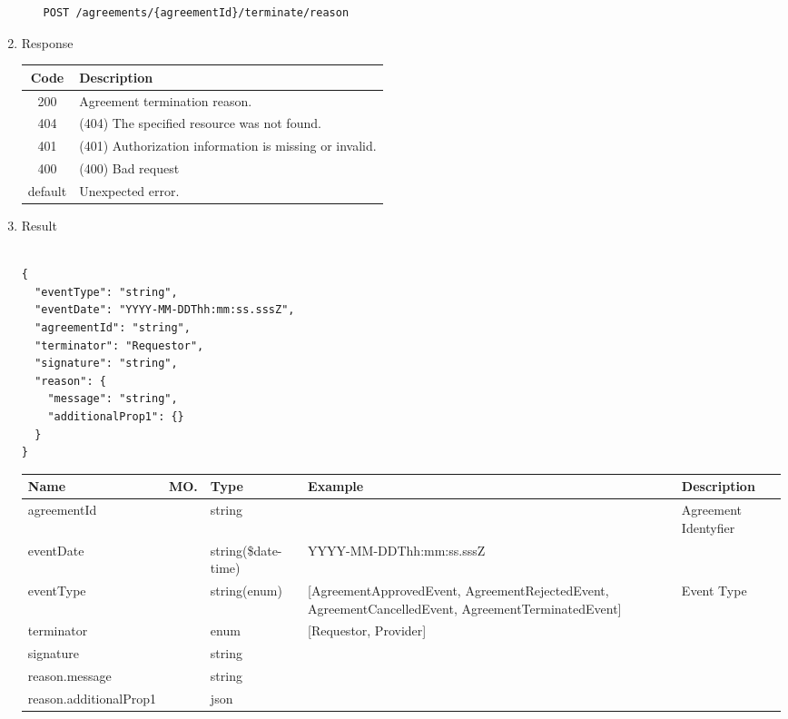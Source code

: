 \begin{enumerate}
\begin{enumerate}
\begin{tcolorbox}[boxrule=0pt, frame empty]
\begin{verbatim}
POST /agreements/{agreementId}/terminate/reason

\end{verbatim}
\end{tcolorbox}

\end{enumerate}

\item Response

\begin{center}
\begin{tabular}{|c|l|} 
\hline
\rowcolor{lightgray}	Code 		& 	Description \\
\hline
200	 		&	Agreement termination reason. \\
\hline
404			&	(404) The specified resource was not found. \\
\hline
401			&	(401) Authorization information is missing or invalid. \\
\hline
400			&	(400) Bad request \\
\hline
default		&	Unexpected error. \\
\hline
\end{tabular}
\end{center}

\item Result

\begin{tcolorbox}[boxrule=0pt, frame empty]
\begin{verbatim}

{
  "eventType": "string",
  "eventDate": "YYYY-MM-DDThh:mm:ss.sssZ",
  "agreementId": "string",
  "terminator": "Requestor",
  "signature": "string",
  "reason": {
    "message": "string",
    "additionalProp1": {}
  }
}

\end{verbatim}
\end{tcolorbox}

\begin{center}
\begin{tabular}{|p{3cm}|l|p{3cm}|p{3cm}|p{4cm}|} 
\hline
\rowcolor{lightgray}	Name	& MO.	& Type	& Example & 	Description \\
\hline
agreementId		& 	& 	string				&								&	Agreement Identyfier \\ 
\hline
eventDate		& 	& 	string(\$date-time)	&	YYYY-MM-DDThh:mm:ss.sssZ	&	 \\ 
\hline
eventType		& 	& 	string(enum)		&	[AgreementApprovedEvent, AgreementRejectedEvent, AgreementCancelledEvent, AgreementTerminatedEvent] &	Event Type \\ 
\hline
terminator 		&	&	enum 				& [Requestor, Provider]			&				\\
\hline
signature 		&	&	string 				&								&				\\
\hline
reason.message 	&	&	string 				&								&				\\
\hline
reason.additionalProp1	&	&	json 			&								&				\\
\hline


\end{tabular}
\end{center}
\end{enumerate}
